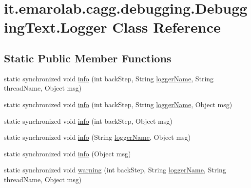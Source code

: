 \hypertarget{classit_1_1emarolab_1_1cagg_1_1debugging_1_1DebuggingText_1_1Logger}{\section{it.\-emarolab.\-cagg.\-debugging.\-Debugging\-Text.\-Logger Class Reference}
\label{classit_1_1emarolab_1_1cagg_1_1debugging_1_1DebuggingText_1_1Logger}
}
\subsection*{Static Public Member Functions}
\begin{DoxyCompactItemize}
\item 
static synchronized void \hyperlink{classit_1_1emarolab_1_1cagg_1_1debugging_1_1DebuggingText_1_1Logger_abc14328ed3197d6046b190447c4a5a43}{info} (int back\-Step, String \hyperlink{classit_1_1emarolab_1_1cagg_1_1debugging_1_1DebuggingText_afa1175bdb0c7a658affe0b25a8a924c3}{logger\-Name}, String thread\-Name, Object msg)
\item 
static synchronized void \hyperlink{classit_1_1emarolab_1_1cagg_1_1debugging_1_1DebuggingText_1_1Logger_a7eebe2fce213bfa9eff0905886a39b14}{info} (int back\-Step, String \hyperlink{classit_1_1emarolab_1_1cagg_1_1debugging_1_1DebuggingText_afa1175bdb0c7a658affe0b25a8a924c3}{logger\-Name}, Object msg)
\item 
static synchronized void \hyperlink{classit_1_1emarolab_1_1cagg_1_1debugging_1_1DebuggingText_1_1Logger_a87a8528398da69ab0b844ad4ec556e92}{info} (int back\-Step, Object msg)
\item 
static synchronized void \hyperlink{classit_1_1emarolab_1_1cagg_1_1debugging_1_1DebuggingText_1_1Logger_a49b276d5b3a22d34388e7c3d076f2b50}{info} (String \hyperlink{classit_1_1emarolab_1_1cagg_1_1debugging_1_1DebuggingText_afa1175bdb0c7a658affe0b25a8a924c3}{logger\-Name}, Object msg)
\item 
static synchronized void \hyperlink{classit_1_1emarolab_1_1cagg_1_1debugging_1_1DebuggingText_1_1Logger_aff9e83430d3d3bbf81ad30e528fead72}{info} (Object msg)
\item 
static synchronized void \hyperlink{classit_1_1emarolab_1_1cagg_1_1debugging_1_1DebuggingText_1_1Logger_acdc72a648851a59d69f4d7d9def9aafe}{warning} (int back\-Step, String \hyperlink{classit_1_1emarolab_1_1cagg_1_1debugging_1_1DebuggingText_afa1175bdb0c7a658affe0b25a8a924c3}{logger\-Name}, String thread\-Name, Object msg)

\end{DoxyCompactItemize}
